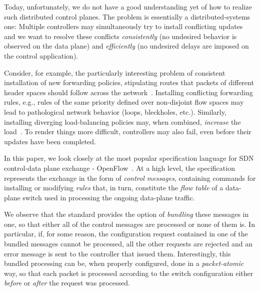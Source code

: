 \documentclass[conference]{sigcomm-alternate}
\begin{document}

Today, unfortunately, we do not have a good understanding yet of how to realize
such distributed control planes. The problem is essentially a
distributed-systems 
one: Multiple controllers may simultaneously try to
install conflicting updates and we want to resolve these conflicts
\emph{consistently} (no undesired behavior is observed on the data
plane) and \emph{efficiently} (no undesired delays are imposed on the
control application).

Consider, for example, the particularly interesting problem of
consistent installation of new forwarding policies, stipulating routes
that packets of different header spaces should follow across the
network~\cite{network-update,roger-hotnets,correct,stn}.
Installing conflicting forwarding rules, e.g., rules of the same priority defined over non-disjoint
flow spaces may lead to pathological network behavior (loops,
bleckholes, etc.).
Similarly, installing diverging load-balancing policies may, when combined, \emph{increase} the load~\cite{log-cent}. 
To render things more difficult, controllers may also fail, even before their updates have been completed. 

%
In this paper, we look closely at the most popular specification
language for SDN control-data plane exchange -
OpenFlow~\cite{of-spec}. 
At a high level, the specification represents the exchange in the form
of \emph{control messages}, containing commands for installing or
modifying \emph{rules} that, in turn, constitute the \emph{flow table} of
a data-plane switch used in processing the ongoing data-plane traffic. 

We observe that the standard provides the option of \emph{bundling}
these messages in one, so that either all of the control messages are
processed or none of them is. In particular, if, for some reason, the
configuration request contained in one of the bundled messages cannot
be processed, all the other requests  are rejected and an error
message is sent to the controller that issued them.       
Interestingly, this bundled processing can be, when properly configured, done in a
\emph{packet-atomic} way, so that each packet is processed according
to the switch configuration either \emph{before} or \emph{after} the
request was processed. 
     
\end{document}
